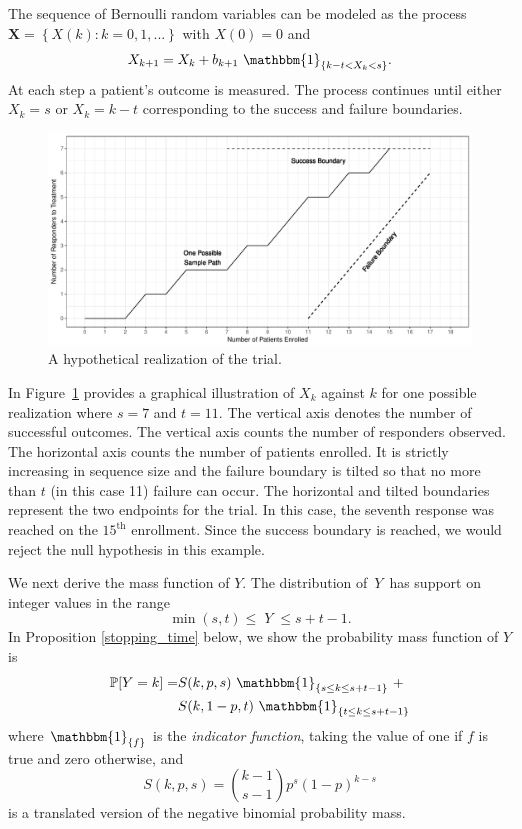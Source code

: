 \documentclass[sii]{ipart}
\begin{document}
The sequence of Bernoulli random variables can be modeled as the process 
$\mathbf{X} = \left\{X(k) : k = 0,1,... \right\}$
with $X(0)=0$ and
\begin{equation*} \label{eqn:proc}
X_{k+1} = X_k + b_{k+1} \ \mathbbm{1}_{\{ k-t < X_k < s\}}.
\end{equation*}
At each step a patient's outcome is measured. The process continues until either 
$X_k = s$ or $X_k = k-t$ corresponding to the success and failure boundaries.

\begin{figure}
\centering
\includegraphics[width=\textwidth]{KanePlot.pdf}
\caption{
A hypothetical realization of the trial.
}
\label{fig:kane_viz}
\end{figure}

In Figure~\ref{fig:kane_viz} provides a graphical illustration of $X_k$ against
$k$ for one possible realization where $s=7$ and $t=11$. The vertical axis denotes the number of
successful outcomes. The vertical axis counts the number of responders observed.
The horizontal axis counts the number of patients 
enrolled. It is strictly increasing in sequence size and the failure boundary is tilted so that no more than $t$ (in this case 11) failure can occur. The horizontal and tilted boundaries represent the two
endpoints for the trial. In this case, the seventh response was reached on
the $15^{\text{th}}$ enrollment.
Since the success boundary is reached, we would reject the null hypothesis in this example.

We next derive the mass function of $Y$. The distribution of $\,Y\,$ has support on integer values in the range
\begin{equation*}               
     \min(s,t) \leq \; Y \;\leq s+t-1  \label{range.y.eq}.
\end{equation*}
In Proposition \ref{stopping_time} below, we show the probability mass function of $Y$ is
\begin{align} \label{eqn:pmf}
\mathbb{P} [Y=k] =& S(k, p, s) \ \mathbbm{1}_{\{s \leq k \leq s+t-1\}} \ + \nonumber \\
  & S(k, 1-p, t) \ \mathbbm{1}_{\{ t \leq k \leq s+t-1 \}}
\end{align}
where $\mathbbm{1}_{\{f\}}$ is the {\em indicator function}, taking the value 
of one if $f$ is true and zero otherwise, and
\begin{equation} \label{eqn:N}
S(k, p, s) = {k-1 \choose s-1} p^s (1-p)^{k-s} 
\end{equation}
is a translated version of the negative binomial probability mass.
\end{document}
